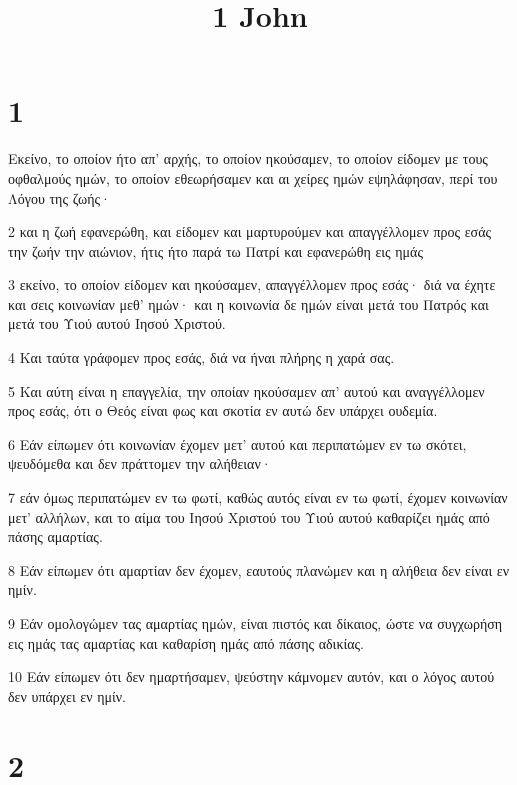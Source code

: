 

\title{1 John}


\chapter{1}

\par Εκείνο, το οποίον ήτο απ' αρχής, το οποίον ηκούσαμεν, το οποίον είδομεν με τους οφθαλμούς ημών, το οποίον εθεωρήσαμεν και αι χείρες ημών εψηλάφησαν, περί του Λόγου της ζωής·
\par 2 και η ζωή εφανερώθη, και είδομεν και μαρτυρούμεν και απαγγέλλομεν προς εσάς την ζωήν την αιώνιον, ήτις ήτο παρά τω Πατρί και εφανερώθη εις ημάς
\par 3 εκείνο, το οποίον είδομεν και ηκούσαμεν, απαγγέλλομεν προς εσάς· διά να έχητε και σεις κοινωνίαν μεθ' ημών· και η κοινωνία δε ημών είναι μετά του Πατρός και μετά του Υιού αυτού Ιησού Χριστού.
\par 4 Και ταύτα γράφομεν προς εσάς, διά να ήναι πλήρης η χαρά σας.
\par 5 Και αύτη είναι η επαγγελία, την οποίαν ηκούσαμεν απ' αυτού και αναγγέλλομεν προς εσάς, ότι ο Θεός είναι φως και σκοτία εν αυτώ δεν υπάρχει ουδεμία.
\par 6 Εάν είπωμεν ότι κοινωνίαν έχομεν μετ' αυτού και περιπατώμεν εν τω σκότει, ψευδόμεθα και δεν πράττομεν την αλήθειαν·
\par 7 εάν όμως περιπατώμεν εν τω φωτί, καθώς αυτός είναι εν τω φωτί, έχομεν κοινωνίαν μετ' αλλήλων, και το αίμα του Ιησού Χριστού του Υιού αυτού καθαρίζει ημάς από πάσης αμαρτίας.
\par 8 Εάν είπωμεν ότι αμαρτίαν δεν έχομεν, εαυτούς πλανώμεν και η αλήθεια δεν είναι εν ημίν.
\par 9 Εάν ομολογώμεν τας αμαρτίας ημών, είναι πιστός και δίκαιος, ώστε να συγχωρήση εις ημάς τας αμαρτίας και καθαρίση ημάς από πάσης αδικίας.
\par 10 Εάν είπωμεν ότι δεν ημαρτήσαμεν, ψεύστην κάμνομεν αυτόν, και ο λόγος αυτού δεν υπάρχει εν ημίν.

\chapter{2}

